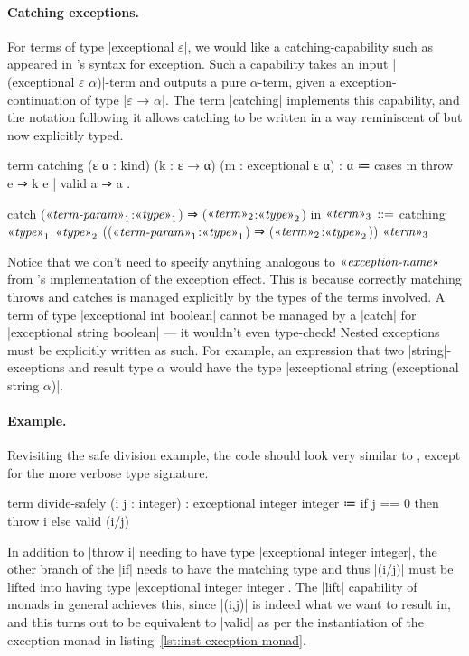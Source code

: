 \paragraph{Catching exceptions.}
For terms of type \code|exceptional $ε$|, we would like a catching-capability such as appeared in \LangB's syntax for exception.
Such a capability takes an input \code|(exceptional $ε$ $α$)|-term and outputs a pure $α$-term, given a exception-continuation of type \code|$ε$ → $α$|.
The term \code|catching| implements this capability, and the notation following it allows catching to be written in a way reminiscent of \LangB but now explicitly typed.
\begin{program}[caption={Definition of catching for exceptions}]
term catching (ε α : kind) (k : ε → α) (m : exceptional ε α) : α
  ≔ cases m
      { throw e ⇒ k e
      | valid a ⇒ a }.
\end{program}
%
\begin{notational}[caption={Notation of catching for exceptions}]
catch{ ($\mvar{term-param}_1$:$\mvar{type}_1$) ⇒ ($\mvar{term}_2$:$\mvar{type}_2$) } in $\mvar{term}_3$
  $\syneq$
    catching $\mvar{type}_1$ $\mvar{type}_2$ (($\mvar{term-param}_1$:$\mvar{type}_1$) ⇒ ($\mvar{term}_2$:$\mvar{type}_2$))
      $\mvar{term}_3$
\end{notational}
%
Notice that we don't need to specify anything analogous to $\mvar{exception-name}$ from \LangB's implementation of the exception effect.
This is because correctly matching throws and catches is managed explicitly by the types of the terms involved.
A term of type \code|exceptional int boolean| cannot be managed by a \code|catch| for \code|exceptional string boolean| --- it wouldn't even type-check!
Nested exceptions must be explicitly written as such.
For example, an expression that two \code|string|-exceptions and result type $α$ would have the type \code|exceptional string (exceptional string $α$)|.

\paragraph{Example.}
Revisiting the safe division example, the code should look very similar to \LangB, except for the more verbose type signature.
%
\begin{snippet}
term divide-safely (i j : integer)
  : exceptional integer integer
  ≔ if j == 0
      then throw i
      else valid (i/j)
\end{snippet}
%
In addition to \code|throw i| needing to have type \code|exceptional integer integer|,
the other branch of the \code|if| needs to have the matching type and thus \code|(i/j)| must be lifted into having type \code|exceptional integer integer|.
The \code|lift| capability of monads in general achieves this, since \code|(i,j)| is indeed what we want to result in, and this turns out to be equivalent to \code|valid| as per the instantiation of the exception monad in listing~\ref{lst:inst-exception-monad}.


